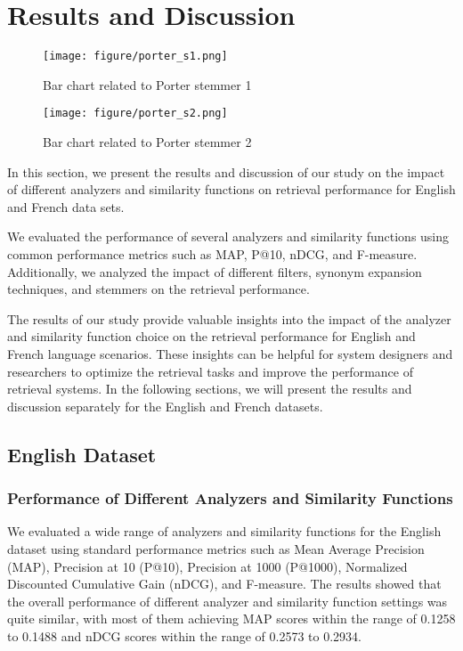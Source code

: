 \section{Results and Discussion}
\label{sec:results}

\begin{figure}[htbp]
  \centering
  \begin{minipage}{0.45\textwidth}
    \centering
    \texttt{[image: figure/porter\_s1.png]}
    \caption{Bar chart related to Porter stemmer 1}
    \label{fig:Porter1_stem}
  \end{minipage}\hfill
  \begin{minipage}{0.45\textwidth}
    \centering
    \texttt{[image: figure/porter\_s2.png]}
    \caption{Bar chart related to Porter stemmer 2}
    \label{fig:Porter2_stem}
  \end{minipage}
\end{figure}

In this section, we present the results and discussion of our study on the impact of different analyzers and similarity functions on retrieval performance for English and French data sets.

We evaluated the performance of several analyzers and similarity functions using common performance metrics such as MAP, P@10, nDCG, and F-measure. Additionally, we analyzed the impact of different filters, synonym expansion techniques, and stemmers on the retrieval performance.

The results of our study provide valuable insights into the impact of the analyzer and similarity function choice on the retrieval performance for English and French language scenarios. These insights can be helpful for system designers and researchers to optimize the retrieval tasks and improve the performance of retrieval systems. In the following sections, we will present the results and discussion separately for the English and French datasets.

\subsection{English Dataset}

\subsubsection{Performance of Different Analyzers and Similarity Functions}

We evaluated a wide range of analyzers and similarity functions for the English dataset using standard performance metrics such as Mean Average Precision (MAP), Precision at 10 (P@10), Precision at 1000 (P@1000), Normalized Discounted Cumulative Gain (nDCG), and F-measure. The results showed that the overall performance of different analyzer and similarity function settings was quite similar, with most of them achieving MAP scores within the range of 0.1258 to 0.1488 and nDCG scores within the range of 0.2573 to 0.2934. 

